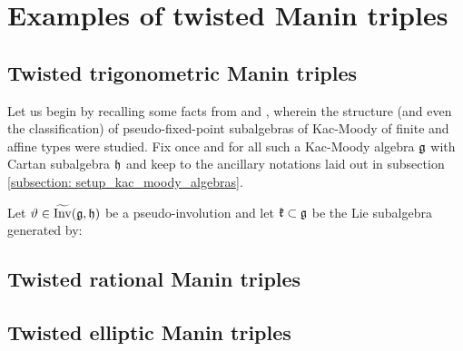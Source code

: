 \section{Examples of twisted Manin triples}
    \subsection{Twisted trigonometric Manin triples}
        Let us begin by recalling some facts from \cite{regelskis_vlaar_finite_QSPs_via_generalised_satake_diagrams} and \cite{regelskis_vlaar_kac_moody_pseudo_symmetric_pairs}, wherein the structure (and even the classification) of pseudo-fixed-point subalgebras of Kac-Moody of finite and affine types were studied. Fix once and for all such a Kac-Moody algebra $\mathfrak{g}$ with Cartan subalgebra $\mathfrak{h}$ and keep to the ancillary notations laid out in subsection \ref{subsection: setup_kac_moody_algebras}.

        Let $\vartheta \in \widetilde{\operatorname{Inv}}(\mathfrak{g}, \mathfrak{h})$ be a pseudo-involution and let $\mathfrak{k} \subset \mathfrak{g}$ be the Lie subalgebra generated by:



    \subsection{Twisted rational Manin triples}

    \subsection{Twisted elliptic Manin triples}